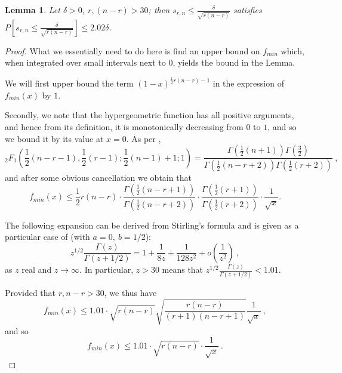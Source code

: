 \documentclass{article}
\newcommand{\red}[1]{\textcolor{red}{#1}}
\newtheorem{lemma}[theorem]{Lemma}
\theoremstyle{definition}
\newcommand{\smin}{s_{r,n}}
\begin{document}
\begin{lemma} 
\label{low_bd}
Let $\delta>0$, $r, (n-r)>30$; then $\smin \leq \frac{\delta}{\sqrt{r(n-r)}}$
satisfies $P\left [ \smin \leq \frac{\delta}{\sqrt{r(n-r)}} \right] \leq  2.02 \delta$.
\end{lemma}
\begin{proof} 

What we essentially need to do here is find an upper bound on $f_{min}$ which, when integrated over small intervals next to $0$, yields the bound in the Lemma.

We will first upper bound the term $(1-x)^{\frac{1}{2}r(n-r)-1}$ in the expression of $f_{min}(x)$ by $1$.

Secondly, we note that the hypergeometric function has all positive arguments, and hence from its definition, it is  monotonically decreasing from $0$ to $1$, and so we bound it by its value at $x=0$. As per \red{\cite[Formula 15.1.20]{Abr_Steg}}, 
\[
_{2}F_{1} \left ( \frac{1}{2}(n-r-1), \frac{1}{2}(r-1); \frac{1}{2}(n-1)+1; 1\right) = \frac{\Gamma \left (\frac{1}{2} (n+1) \right) \Gamma\left(\frac{3}{2}\right)}{\Gamma \left ( \frac{1}{2}(n-r+2)\right) \Gamma \left ( \frac{1}{2} (r+2) \right) }~,
\]
and after some obvious cancellation we obtain that 
\[
f_{min}(x) \leq \frac{1}{2} r(n-r) \cdot \frac{\Gamma \left ( \frac{1}{2}(n-r+1)\right)}{\Gamma \left (\frac{1}{2}(n-r+2)\right)} \cdot \frac{\Gamma \left(\frac{1}{2}(r+1)\right)}{\Gamma \left ( \frac{1}{2} (r+2)\right)} \cdot \frac{1}{\sqrt{x}}.
\]

The following expansion can be derived from Stirling's formula and is given as a particular case of \cite[Formula 6.1.47]{Abr-Steg} (with $a = 0,~b = 1/2$):
\[
z^{1/2} \frac{\Gamma(z)}{\Gamma(z+ 1/2)} = 1 + \frac{1}{8z} + \frac{1}{128z^2} + o\left(\frac{1}{z^2}\right)~,
\]
as $z$ real and $z \rightarrow \infty$. 
In particular, $z>30$ means that $z^{1/2} \frac{\Gamma(z)}{\Gamma(z+ 1/2)} < 1.01$. %

Provided that $r, n-r >30$, we thus have
\[
f_{min}(x) \leq 1.01 \cdot \sqrt{ r(n-r)} \sqrt{\frac{r(n-r)}{(r+1)(n-r+1)}} \frac{1}{\sqrt{x}}~,
\]
and so
\[
f_{min}(x) \leq 1.01  \cdot \sqrt{ r(n-r)}  \cdot \frac{1}{\sqrt{x}}~.
\]


\end{proof}
\end{document}

